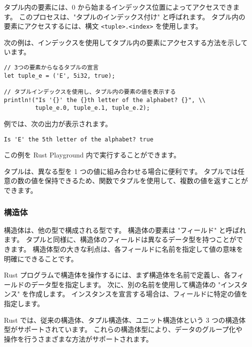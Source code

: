 タプル内の要素には、0 から始まるインデックス位置によってアクセスできます。 このプロセスは、"タプルのインデックス付け" と呼ばれます。 タプル内の要素にアクセスするには、構文 \texttt{<tuple>.<index>} を使用します。

次の例は、インデックスを使用してタプル内の要素にアクセスする方法を示しています。



\begin{lstlisting}[numbers=none]
// 3つの要素からなるタプルの宣言
let tuple_e = ('E', 5i32, true);

// タプルインデックスを使用し、タプル内の要素の値を表示する
println!("Is '{}' the {}th letter of the alphabet? {}", \\
         tuple_e.0, tuple_e.1, tuple_e.2);
\end{lstlisting}

例では、次の出力が表示されます。

\begin{lstlisting}[numbers=none]
Is 'E' the 5th letter of the alphabet? true
\end{lstlisting}

この例を Rust Playground 内で実行することができます。

タプルは、異なる型を 1 つの値に組み合わせる場合に便利です。 タプルでは任意の数の値を保持できるため、関数でタプルを使用して、複数の値を返すことができます。

\subsubsection{構造体}

構造体は、他の型で構成される型です。 構造体の要素は "フィールド" と呼ばれます。 タプルと同様に、構造体のフィールドは異なるデータ型を持つことができます。 構造体型の大きな利点は、各フィールドに名前を指定して値の意味を明確にできることです。

Rust プログラムで構造体を操作するには、まず構造体を名前で定義し、各フィールドのデータ型を指定します。 次に、別の名前を使用して構造体の "インスタンス" を作成します。 インスタンスを宣言する場合は、フィールドに特定の値を指定します。

Rust では、従来の構造体、タプル構造体、ユニット構造体という 3 つの構造体型がサポートされています。 これらの構造体型により、データのグループ化や操作を行うさまざまな方法がサポートされます。


